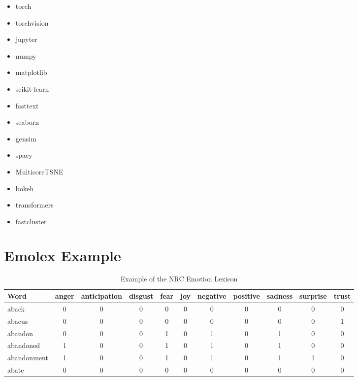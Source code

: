 \begin{itemize}
  \item torch
  \item torchvision
  \item jupyter
  \item numpy
  \item matplotlib
  \item scikit-learn
  \item fasttext
  \item seaborn
  \item gensim
  \item spacy
  \item MulticoreTSNE
  \item bokeh
  \item transformers
  \item fastcluster
\end{itemize}

\section{Emolex Example}\label{sec:Emolex Example}

\begin{landscape}
  \begin{table}
    \begin{tabular}{|l|c|c|c|c|c|c|c|c|c|c|}
      \hline
      Word        & anger & anticipation & disgust & fear & joy & negative & positive & sadness & surprise & trust \\
      \hline
      aback       & 0     & 0            & 0       & 0    & 0   & 0        & 0        & 0       & 0        & 0 \\
      abacus      & 0     & 0            & 0       & 0    & 0   & 0        & 0        & 0       & 0        & 1 \\
      abandon     & 0     & 0            & 0       & 1    & 0   & 1        & 0        & 1       & 0        & 0 \\
      abandoned   & 1     & 0            & 0       & 1    & 0   & 1        & 0        & 1       & 0        & 0 \\
      abandonment & 1     & 0            & 0       & 1    & 0   & 1        & 0        & 1       & 1        & 0 \\
      abate       & 0     & 0            & 0       & 0    & 0   & 0        & 0        & 0       & 0        & 0 \\
      \hline
    \end{tabular}
    \caption{Example of the NRC Emotion Lexicon}
  \end{table}
\end{landscape}
